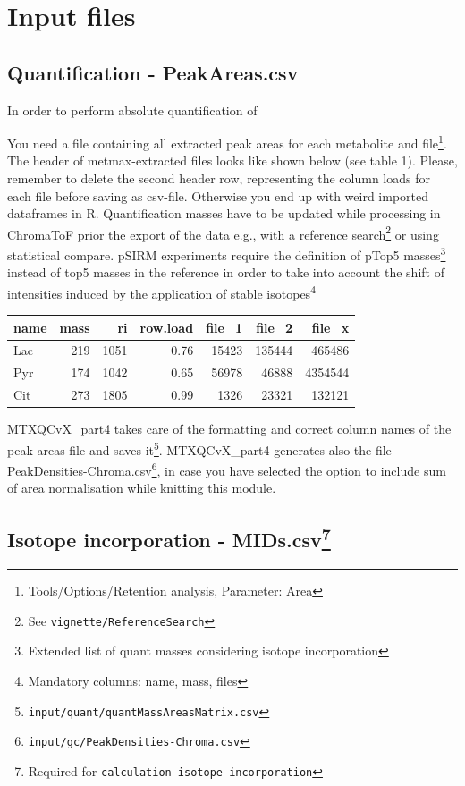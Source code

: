 \documentclass[]{book}
\let\rmarkdownfootnote\footnote%
\def\footnote{\protect\rmarkdownfootnote}
\theoremstyle{definition}
\theoremstyle{definition}
\theoremstyle{definition}
\theoremstyle{remark}
\begin{document}
\section{Input files}\label{input-files-1}

\subsection{Quantification -
PeakAreas.csv}\label{quantification---peakareas.csv}

In order to perform absolute quantification of

You need a file containing all extracted peak areas for each metabolite
and file\footnote{Tools/Options/Retention analysis, Parameter: Area}.
The header of metmax-extracted files looks like shown below (see table
1). Please, remember to delete the second header row, representing the
column loads for each file before saving as csv-file. Otherwise you end
up with weird imported dataframes in R. Quantification masses have to be
updated while processing in ChromaToF prior the export of the data e.g.,
with a reference search\footnote{See \texttt{vignette/ReferenceSearch}}
or using statistical compare. pSIRM experiments require the definition
of pTop5 masses\footnote{Extended list of quant masses considering
  isotope incorporation} instead of top5 masses in the reference in
order to take into account the shift of intensities induced by the
application of stable isotopes\footnote{Mandatory columns: name, mass,
  files}

\begin{tabular}{l|r|r|r|r|r|r}
\hline
name & mass & ri & row.load & file\_1 & file\_2 & file\_x\\
\hline
Lac & 219 & 1051 & 0.76 & 15423 & 135444 & 465486\\
\hline
Pyr & 174 & 1042 & 0.65 & 56978 & 46888 & 4354544\\
\hline
Cit & 273 & 1805 & 0.99 & 1326 & 23321 & 132121\\
\hline
\end{tabular}

MTXQCvX\_part4 takes care of the formatting and correct column names of
the peak areas file and saves it\footnote{\texttt{input/quant/quantMassAreasMatrix.csv}}.
MTXQCvX\_part4 generates also the file
PeakDensities-Chroma.csv\footnote{\texttt{input/gc/PeakDensities-Chroma.csv}},
in case you have selected the option to include sum of area
normalisation while knitting this module.

\subsection[Isotope incorporation - MIDs.csv]{\texorpdfstring{Isotope
incorporation - MIDs.csv\footnote{Required for
  \texttt{calculation\ isotope\ incorporation}}}{Isotope incorporation - MIDs.csv}}\label{isotope-incorporation---mids.csv}
\end{document}
